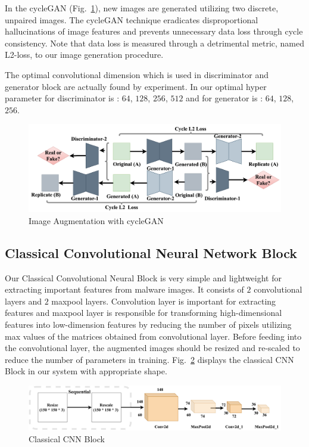 \documentclass[pdflatex,sn-mathphys]{sn-jnl}%
\begin{document}
In the cycleGAN (Fig.~\ref{dataaug}), new images are generated utilizing two discrete, unpaired images. The cycleGAN technique eradicates disproportional hallucinations of image features and prevents unnecessary data loss through cycle consistency. Note that data loss is measured through a detrimental metric, named L2-loss, to our image generation procedure.

\color{blue}
The optimal convolutional dimension which is used in discriminator and generator block are actually found by experiment. In our optimal hyper parameter for discriminator is : $64$, $128$, $256$, $512$ and for generator is : $64$, $128$, $256$. 
\color{black}


\begin{figure}[tb]
	\centering
	\includegraphics[width=1.0\textwidth]{data-aug.png}
	\caption{Image Augmentation with cycleGAN}
	\label{dataaug}
\end{figure}

\subsection{Classical Convolutional Neural Network Block}
Our Classical Convolutional Neural Block is very simple and lightweight for extracting important features from malware images. It consists of $2$ convolutional layers and $2$ maxpool layers. Convolution layer is important for extracting features and maxpool layer is responsible for transforming high-dimensional features into low-dimension features by reducing the number of pixels utilizing max values of the matrices obtained from convolutional layer. Before feeding into the convolutional layer, the augmented images should be resized and re-scaled to reduce the number of parameters in training. Fig.~\ref{ClassicalCNN} displays the classical CNN Block in our system with appropriate shape.

\begin{figure}[ht]
	\centering
	\includegraphics[width=1\textwidth]{sequential.png}
	\caption{Classical CNN Block}
	\label{ClassicalCNN}
\end{figure}
\end{document}

